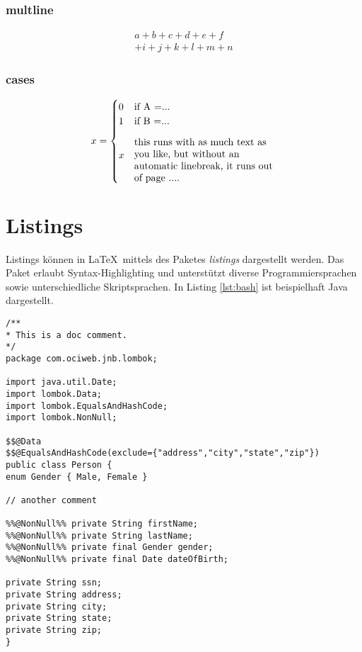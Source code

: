 \subsubsection{multline}

\begin{multline}
a+b+c+d+e+f\\
+i+j+k+l+m+n
\end{multline}

\subsubsection{cases}
\begin{equation}
x = \begin{cases}
   0 & \text{if A =...}\\
   1 & \text{if B =...}\\
   x & \parbox{5 cm}{%
\flushleft %
this runs with as much text as you like,
but without an automatic linebreak,
it runs out of page ....} %
\end{cases}
\end{equation}
\newpage
\section{Listings}

Listings können in \LaTeX ~mittels des Paketes \textit{listings} dargestellt werden. Das Paket erlaubt Syntax-Highlighting und unterstützt diverse Programmiersprachen sowie unterschiedliche Skriptsprachen. In Listing \ref{lst:bash} ist beispielhaft Java dargestellt.

\begin{lstlisting}[caption=Java example,label=lst:bash]
/**
* This is a doc comment.
*/
package com.ociweb.jnb.lombok;

import java.util.Date;
import lombok.Data;
import lombok.EqualsAndHashCode;
import lombok.NonNull;

$$@Data
$$@EqualsAndHashCode(exclude={"address","city","state","zip"})
public class Person {
enum Gender { Male, Female }

// another comment

%%@NonNull%% private String firstName;
%%@NonNull%% private String lastName;
%%@NonNull%% private final Gender gender;
%%@NonNull%% private final Date dateOfBirth;

private String ssn;
private String address;
private String city;
private String state;
private String zip;
}
\end{lstlisting}

